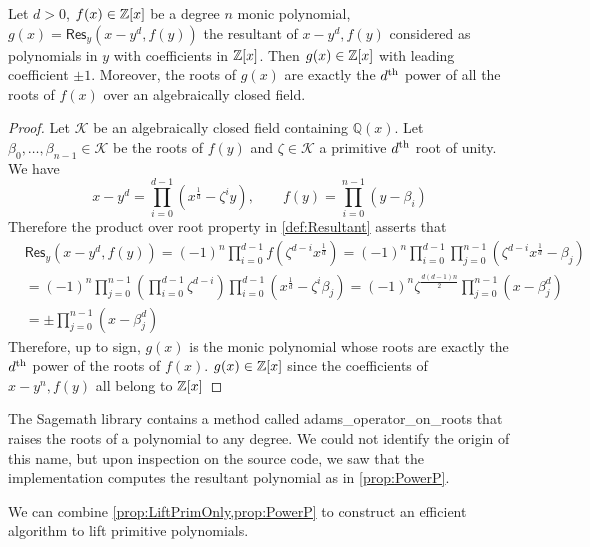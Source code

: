 \begin{proposition} \label{prop:PowerP}
    Let \(d > 0\), \(f(x) \in \mathbb{Z}[x]\) be a degree \(n\) monic polynomial, \(g(x) = \mathsf{Res}_y(x - y^d, f(y))\) the resultant of \(x - y^d, f(y)\) considered as polynomials in \(y\) with coefficients in \(\mathbb{Z}[x]\). Then \(g(x) \in \mathbb{Z}[x]\) with leading coefficient \(\pm 1\). Moreover, the roots of \(g(x)\) are exactly the \(d\textsuperscript{th}\) power of all the roots of \(f(x)\) over an algebraically closed field.
\end{proposition}
\begin{proof}
    Let \(\mathcal{K}\) be an algebraically closed field containing \(\mathbb{Q}(x)\). Let \(\beta_0, \ldots, \beta_{n-1} \in \mathcal{K}\) be the roots of \(f(y)\) and \(\zeta \in \mathcal{K}\) a primitive \(d\textsuperscript{th}\) root of unity. We have
    \[ x - y^d = \prod_{i=0}^{d-1} (x^{\frac{1}{d}} - \zeta^i y), \qquad 
    f(y) = \prod_{i=0}^{n-1} (y - \beta_i) \]
    Therefore the product over root property in \cref{def:Resultant} asserts that
    \begin{align*}
        &\mathsf{Res}_y(x-y^d, f(y)) = (-1)^n \prod_{i=0}^{d-1} f(\zeta^{d-i} x^{\frac{1}{d}}) = (-1)^n \prod_{i=0}^{d-1} \prod_{j=0}^{n-1}(\zeta^{d-i} x^{\frac{1}{d}} - \beta_j) \\
        &= (-1)^n \prod_{j=0}^{n-1}\left(\prod_{i=0}^{d-1}\zeta^{d-i}\right)\prod_{i=0}^{d-1}(x^{\frac{1}{d}} - \zeta^i \beta_j) = (-1)^n \zeta^{\frac{d(d-1)n}{2}} \prod_{j=0}^{n-1} (x - \beta_j^d) \\
        &= \pm \prod_{j=0}^{n-1}(x - \beta_j^d)
    \end{align*}
    Therefore, up to sign, \(g(x)\) is the monic polynomial whose roots are exactly the \(d\textsuperscript{th}\) power of the roots of \(f(x)\). \(g(x) \in \mathbb{Z}[x]\) since the coefficients of \(x - y^n, f(y)\) all belong to \(\mathbb{Z}[x]\)
\end{proof}

\begin{remark}
    The Sagemath library contains a method called adams\_operator\_on\_roots that raises the roots of a polynomial to any degree. We could not identify the origin of this name, but upon inspection on the source code, we saw that the implementation computes the resultant polynomial as in \cref{prop:PowerP}.
\end{remark}

We can combine \cref{prop:LiftPrimOnly,prop:PowerP} to construct an efficient algorithm to lift primitive polynomials.

